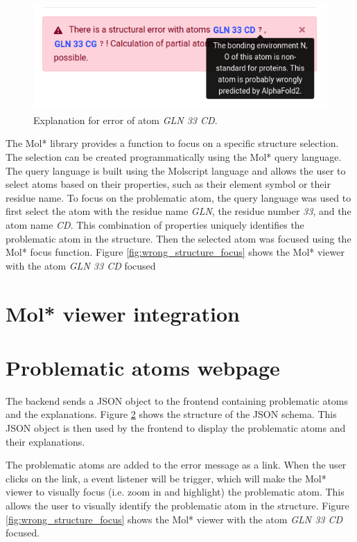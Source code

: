 \documentclass[
  digital,     %
  oneside,     %
  nosansbold,  %
  nocolorbold, %
  lof,         %
  lot,         %
]{fithesis4}
\begin{document}
\begin{figure}[htbp]
  \begin{center}
    \includegraphics[width=12cm]{figures/wrong_structure_text.png}
  \end{center}
  \caption{Explanation for error of atom \textit{GLN 33 CD}.}
  \label{fig:wrong_structure_text}
\end{figure}

The Mol* library provides a function to focus on a specific structure selection. The selection can be created programmatically using the Mol* query language. The query language is built using the Molscript language \parencite{kraulis1991molscript} and allows the user to select atoms based on their properties, such as their element symbol or their residue name. To focus on the problematic atom, the query language was used to first select the atom with the residue name \textit{GLN}, the residue number \textit{33}, and the atom name \textit{CD}. This combination of properties uniquely identifies the problematic atom in the structure. Then the selected atom was focused using the Mol* focus function. Figure \ref{fig:wrong_structure_focus} shows the Mol* viewer with the atom \textit{GLN 33 CD} focused

\section{Mol* viewer integration}


\section{Problematic atoms webpage}

The backend sends a JSON object to the frontend containing problematic atoms and the explanations. Figure \ref{} shows the structure of the JSON schema. This JSON object is then used by the frontend to display the problematic atoms and their explanations.

The problematic atoms are added to the error message as a link. When the user clicks on the link, a event listener will be trigger, which will make the Mol* viewer to visually focus (i.e. zoom in and highlight) the problematic atom. This allows the user to visually identify the problematic atom in the structure. Figure \ref{fig:wrong_structure_focus} shows the Mol* viewer with the atom \textit{GLN 33 CD} focused.
\end{document}
